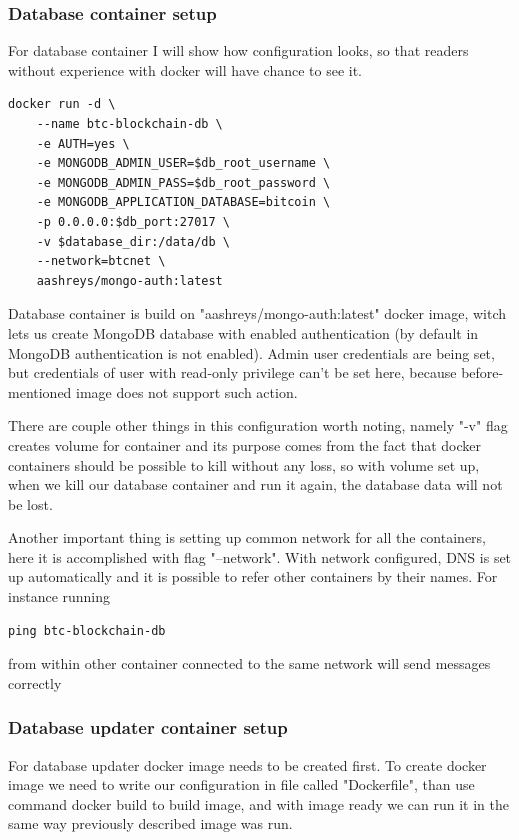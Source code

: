 \documentclass[12pt, en, eng]{mgr}
\begin{document}
\subsubsection{Database container setup}
For database container I will show how configuration looks, so that readers without experience with docker will have chance to see it.

\begin{verbatim}
docker run -d \
    --name btc-blockchain-db \
    -e AUTH=yes \
    -e MONGODB_ADMIN_USER=$db_root_username \
    -e MONGODB_ADMIN_PASS=$db_root_password \
    -e MONGODB_APPLICATION_DATABASE=bitcoin \
    -p 0.0.0.0:$db_port:27017 \
    -v $database_dir:/data/db \
    --network=btcnet \
    aashreys/mongo-auth:latest
\end{verbatim}

Database container is build on "aashreys/mongo-auth:latest" docker image, witch lets us create MongoDB database with enabled authentication (by default in MongoDB authentication is not enabled).
Admin user credentials are being set, but credentials of user with read-only privilege can't be set here, because before-mentioned image does not support such action.

There are couple other things in this configuration worth noting, namely "-v" flag creates volume for container and its purpose comes from the fact that docker containers should be possible to kill without any loss, so with volume set up, when we kill our database container and run it again, the database data will not be lost.

Another important thing is setting up common network for all the containers, here it is accomplished with flag "--network". With network configured, DNS is set up automatically and it is possible to refer other containers by their names. For instance running 
\begin{verbatim}
ping btc-blockchain-db
\end{verbatim}  
from within other container connected to the same network will send messages correctly

\subsubsection{Database updater container setup}
For database updater docker image needs to be created first. To create docker image we need to write our configuration in file called "Dockerfile", than use command docker build to build image, and with image ready we can run it in the same way previously described image was run.
\end{document}
